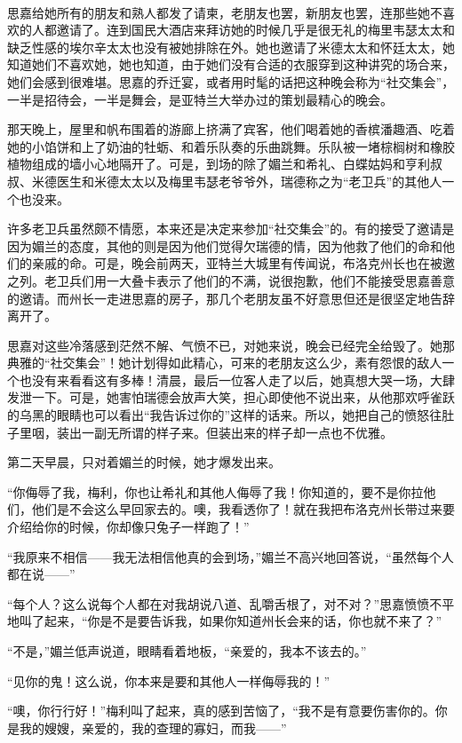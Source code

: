 \par  
\par 思嘉给她所有的朋友和熟人都发了请柬，老朋友也罢，新朋友也罢，连那些她不喜欢的人都邀请了。连到国民大酒店来拜访她的时候几乎是很无礼的梅里韦瑟太太和缺乏性感的埃尔辛太太也没有被她排除在外。她也邀请了米德太太和怀廷太太，她知道她们不喜欢她，她也知道，由于她们没有合适的衣服穿到这种讲究的场合来，她们会感到很难堪。思嘉的乔迁宴，或者用时髦的话把这种晚会称为“社交集会”，一半是招待会，一半是舞会，是亚特兰大举办过的策划最精心的晚会。
\par 那天晚上，屋里和帆布围着的游廊上挤满了宾客，他们喝着她的香槟潘趣酒、吃着她的小馅饼和上了奶油的牡蛎、和着乐队奏的乐曲跳舞。乐队被一堵棕榈树和橡胶植物组成的墙小心地隔开了。可是，到场的除了媚兰和希礼、白蝶姑妈和亨利叔叔、米德医生和米德太太以及梅里韦瑟老爷爷外，瑞德称之为“老卫兵”的其他人一个也没来。
\par 许多老卫兵虽然颇不情愿，本来还是决定来参加“社交集会”的。有的接受了邀请是因为媚兰的态度，其他的则是因为他们觉得欠瑞德的情，因为他救了他们的命和他们的亲戚的命。可是，晚会前两天，亚特兰大城里有传闻说，布洛克州长也在被邀之列。老卫兵们用一大叠卡表示了他们的不满，说很抱歉，他们不能接受思嘉善意的邀请。而州长一走进思嘉的房子，那几个老朋友虽不好意思但还是很坚定地告辞离开了。
\par 思嘉对这些冷落感到茫然不解、气愤不已，对她来说，晚会已经完全给毁了。她那典雅的“社交集会”！她计划得如此精心，可来的老朋友这么少，素有怨恨的敌人一个也没有来看看这有多棒！清晨，最后一位客人走了以后，她真想大哭一场，大肆发泄一下。可是，她害怕瑞德会放声大笑，担心即使他不说出来，从他那欢呼雀跃的乌黑的眼睛也可以看出“我告诉过你的”这样的话来。所以，她把自己的愤怒往肚子里咽，装出一副无所谓的样子来。但装出来的样子却一点也不优雅。
\par 第二天早晨，只对着媚兰的时候，她才爆发出来。
\par “你侮辱了我，梅利，你也让希礼和其他人侮辱了我！你知道的，要不是你拉他们，他们是不会这么早回家去的。噢，我看透你了！就在我把布洛克州长带过来要介绍给你的时候，你却像只兔子一样跑了！”
\par “我原来不相信——我无法相信他真的会到场，”媚兰不高兴地回答说，“虽然每个人都在说——”
\par “每个人？这么说每个人都在对我胡说八道、乱嚼舌根了，对不对？”思嘉愤愤不平地叫了起来，“你是不是要告诉我，如果你知道州长会来的话，你也就不来了？”
\par “不是，”媚兰低声说道，眼睛看着地板，“亲爱的，我本不该去的。”
\par “见你的鬼！这么说，你本来是要和其他人一样侮辱我的！”
\par “噢，你行行好！”梅利叫了起来，真的感到苦恼了，“我不是有意要伤害你的。你是我的嫂嫂，亲爱的，我的查理的寡妇，而我——”
